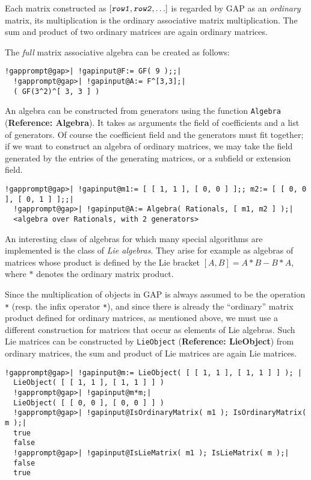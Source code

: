 \documentclass[a4paper,11pt]{report}
\begin{document}
{{ Each matrix constructed as $[ \mbox{\texttt{\mdseries\slshape row1}}, \mbox{\texttt{\mdseries\slshape row2}}, \ldots ]$ is regarded by \textsf{GAP} as an \emph{ordinary} matrix, its multiplication is the ordinary associative matrix multiplication.
The sum and product of two ordinary matrices are again ordinary matrices. 

 The \emph{full} matrix associative algebra can be created as follows: 

 
\begin{Verbatim}[commandchars=!@|,fontsize=\small,frame=single,label=Example]
  !gapprompt@gap>| !gapinput@F:= GF( 9 );;|
  !gapprompt@gap>| !gapinput@A:= F^[3,3];|
  ( GF(3^2)^[ 3, 3 ] )
\end{Verbatim}
 

 An algebra can be constructed from generators using the function \texttt{Algebra} (\textbf{Reference: Algebra}). It takes as arguments the field of coefficients and a list of generators. Of
course the coefficient field and the generators must fit together; if we want
to construct an algebra of ordinary matrices, we may take the field generated
by the entries of the generating matrices, or a subfield or extension field. 

 
\begin{Verbatim}[commandchars=!@|,fontsize=\small,frame=single,label=Example]
  !gapprompt@gap>| !gapinput@m1:= [ [ 1, 1 ], [ 0, 0 ] ];; m2:= [ [ 0, 0 ], [ 0, 1 ] ];;|
  !gapprompt@gap>| !gapinput@A:= Algebra( Rationals, [ m1, m2 ] );|
  <algebra over Rationals, with 2 generators>
\end{Verbatim}
 

 An interesting class of algebras for which many special algorithms are
implemented is the class of \emph{Lie algebras}. They arise for example as algebras of matrices whose product is defined by
the Lie bracket $[ A, B ] = A * B - B * A$, where $*$ denotes the ordinary matrix product. 

 Since the multiplication of objects in \textsf{GAP} is always assumed to be the operation \texttt{*} (resp. the infix operator \texttt{*}), and since there is already the ``ordinary'' matrix product defined for ordinary matrices, as mentioned above, we must use
a different construction for matrices that occur as elements of Lie algebras.
Such Lie matrices can be constructed by \texttt{LieObject} (\textbf{Reference: LieObject}) from ordinary matrices, the sum and product of Lie matrices are again Lie
matrices. 

 
\begin{Verbatim}[commandchars=!@|,fontsize=\small,frame=single,label=Example]
  !gapprompt@gap>| !gapinput@m:= LieObject( [ [ 1, 1 ], [ 1, 1 ] ] ); |
  LieObject( [ [ 1, 1 ], [ 1, 1 ] ] )
  !gapprompt@gap>| !gapinput@m*m;|
  LieObject( [ [ 0, 0 ], [ 0, 0 ] ] )
  !gapprompt@gap>| !gapinput@IsOrdinaryMatrix( m1 ); IsOrdinaryMatrix( m );|
  true
  false
  !gapprompt@gap>| !gapinput@IsLieMatrix( m1 ); IsLieMatrix( m );|
  false
  true
\end{Verbatim}
 

}}
\end{document}
